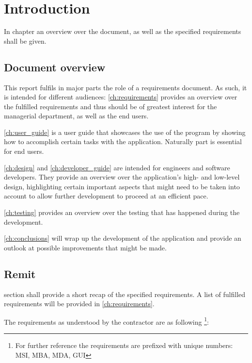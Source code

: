 \chapter{Introduction}\label{ch:introduction}

In  chapter an overview over the document, as well as the specified requirements shall be given.

\section{Document overview}
\label{sec:document_overview}

This report fulfils in major parts the role of a requirements document. As such, it is intended for different audiences:
\autoref{ch:requirements} provides an overview over the fulfilled requirements and thus should be of greatest interest for the managerial department, as well as the end users.

\autoref{ch:user_guide} is a user guide that showcases the use of the program by showing how to accomplish certain tasks with the application. Naturally  part is essential for end users.

\autoref{ch:design} and \autoref{ch:developer_guide} are intended for engineers and software developers. They provide an overview over the application's high- and low-level design, highlighting certain important aspects that might need to be taken into account to allow further development to proceed at an efficient pace.

\autoref{ch:testing} provides an overview over the testing that has happened during the development.

\autoref{ch:conclusions} will wrap up the development of the application and provide an outlook at possible improvements that might be made.

\section{Remit}
\label{sec:remit}

 section shall provide a short recap of the specified requirements. A list of fulfilled requirements will be provided in \autoref{ch:requirements}.

The requirements as understood by the contractor are as following \footnote{For further reference the requirements are prefixed with unique numbers: \ac{MSI}, \ac{MBA}, \ac{MDA}, \ac{GUI}}:

